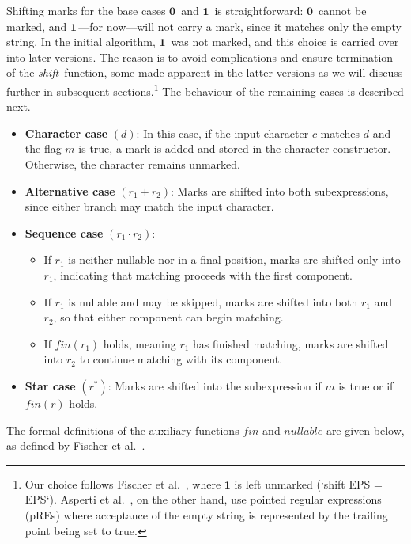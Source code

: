 \documentclass[12pt]{article}
\newcommand{\ZERO}{\textbf{0}}
\newcommand{\ONE}{\textbf{1}}
\newcommand{\shift}{\textit{shift}}
\newcommand{\fin}{\textit{fin}}
\newcommand{\nullable}{\textit{nullable}}
\begin{document}
\noindent
Shifting marks for the base cases $\ZERO\,$ and $\ONE\,$ is straightforward:  
$\ZERO\,$ cannot be marked, and $\ONE\,$---for now---will not carry a mark, 
since it matches only the empty string. In the initial algorithm, $\ONE\,$ was
 not marked, and this choice is carried over into later versions. The reason is 
 to avoid complications and ensure termination of the \shift\ function, some made 
 apparent in the latter versions as we will discuss further in subsequent sections.\footnote{Our choice follows Fischer et al.~\cite{Fischer2010}, where $\ONE$ is left 
 unmarked (`shift EPS = EPS`). Asperti et al.~\cite{Asperti2010}, on the other hand, 
 use pointed regular expressions (pREs) where acceptance of the empty string is represented
  by the trailing point being set to true.} The behaviour of the remaining cases is described next.

\begin{itemize}
  \item \textbf{Character case} $(d)$:  
  In this case, if the input character $c$ matches $d$ and the flag $m$ is true, a mark 
  is added and stored in the character constructor. Otherwise, the character remains unmarked.  

  \item \textbf{Alternative case} $(r_1 + r_2)$:  
  Marks are shifted into both subexpressions, since either branch may match the input character.  

  \item \textbf{Sequence case} $(r_1 \cdot r_2)$:  
  \begin{itemize}
    \item If $r_1$ is neither nullable nor in a final position, marks are shifted only into $r_1$,  
          indicating that matching proceeds with the first component. 

    \item If $r_1$ is nullable and may be skipped, marks are shifted into both $r_1$ and $r_2$,  
          so that either component can begin matching. 

    \item If $\fin(r_1)$ holds, meaning $r_1$ has finished matching, marks are shifted into $r_2$  
          to continue matching with its component.  
  \end{itemize}

  \item \textbf{Star case} $(r^*)$:  
  Marks are shifted into the subexpression if $m$ is true or if $\fin(r)$ holds.  
\end{itemize}
The formal definitions of the auxiliary functions $\fin$ and $\nullable$ are given below, 
as defined by Fischer et al.~\cite{Fischer2010}.
\end{document}
